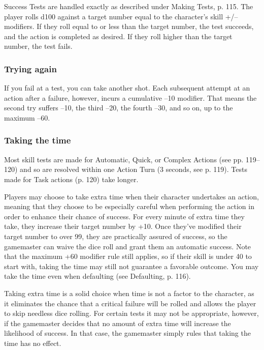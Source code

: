 Success Tests are handled exactly as described under Making Tests,
p. 115. The player rolls d100 against a target number equal to the
character's skill +/– modifiers. If they roll equal to or less than
the target number, the test succeeds, and the action is completed as
desired.  If they roll higher than the target number, the test fails.

\subsubsection{Trying again}
\label{sec:trying-again}

If you fail at a test, you can take another shot. Each subsequent
attempt at an action after a failure, however, incurs a cumulative –10
modifier. That means the second try suffers –10, the third –20, the
fourth –30, and so on, up to the maximum –60.

\subsubsection{Taking the time}
\label{sec:taking-time}

Most skill tests are made for Automatic, Quick, or Complex Actions
(see pp. 119–120) and so are resolved within one Action Turn (3
seconds, see p. 119).  Tests made for Task actions (p. 120) take
longer.

Players may choose to take extra time when their character undertakes
an action, meaning that they choose to be especially careful when
performing the action in order to enhance their chance of success. For
every minute of extra time they take, they increase their target
number by +10. Once they've modified their target number to over 99,
they are practically assured of success, so the gamemaster can waive
the dice roll and grant them an automatic success. Note that the
maximum +60 modifier rule still applies, so if their skill is under 40
to start with, taking the time may still not guarantee a favorable
outcome. You may take the time even when defaulting (see Defaulting,
p. 116).

Taking extra time is a solid choice when time is not a factor to the
character, as it eliminates the chance that a critical failure will be
rolled and allows the player to skip needless dice rolling. For
certain tests it may not be appropriate, however, if the gamemaster
decides that no amount of extra time will increase the likelihood of
success. In that case, the gamemaster simply rules that taking the
time has no effect.


